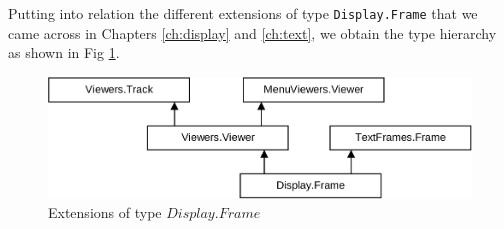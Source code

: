 Putting into relation the different extensions of type \verb|Display.Frame| that we came across
in Chapters \ref{ch:display} and \ref{ch:text}, we obtain the type hierarchy as shown in Fig
\ref{fig:extensions}.
\begin{figure}[h!]
  \centering
  \includegraphics[width=\textwidth]{i/h}
  \caption{Extensions of type $Display.Frame$}
  \label{fig:extensions}
\end{figure}
